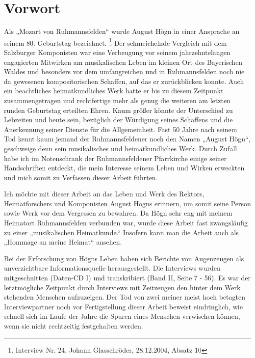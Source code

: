 \documentclass[a4paper]{article}
\begin{document}
\clearpage\setcounter{page}{1}\section{Vorwort}
\hypertarget{RefHeadingToc100333724}{}Als „Mozart von Ruhmannsfelden“
wurde August Högn in einer Ansprache an seinem 80. Geburtstag
bezeichnet. \footnote{Interview Nr. 24, Johann Glasschröder,
28.12.2004, Absatz 10} Der schmeichelnde Vergleich mit dem Salzburger
Komponisten war eine Verbeugung vor seinem jahrzehntelangen engagierten
Mitwirken am musikalischen Leben im kleinen Ort des Bayerischen Waldes
und besonders vor dem umfangreichen und in Ruhmannsfelden noch nie da
gewesenen kompositorischen Schaffen, auf das er zurückblicken konnte.
Auch ein beachtliches heimatkundliches Werk hatte er bis zu diesem
Zeitpunkt zusammengetragen und rechtfertige mehr als genug die weiteren
am letzten runden Geburtstag erteilten Ehren. Kaum größer könnte der
Unterschied zu Lebzeiten und heute sein, bezüglich der Würdigung seines
Schaffens und die Anerkennung seiner Dienste für die Allgemeinheit.
Fast 50 Jahre nach seinem Tod kennt kaum jemand der Ruhmannsfeldener
noch den Namen „August Högn“, geschweige denn sein musikalisches und
heimatkundliches Werk. Durch Zufall habe ich im Notenschrank der
Ruhmannsfeldener Pfarrkirche einige seiner Handschriften entdeckt, die
mein Interesse seinem Leben und Wirken erweckten und mich somit zu
Verfassen dieser Arbeit führten.

Ich möchte mit dieser Arbeit an das Leben und Werk des Rektors,
Heimatforschers und Komponisten August Högns erinnern, um somit seine
Person sowie Werk vor dem Vergessen zu bewahren. Da Högn sehr eng mit
meinem Heimatort Ruhmannsfelden verbunden war, wurde diese Arbeit fast
zwangsläufig zu einer „musikalischen Heimatkunde.“ Insofern kann man
die Arbeit auch als „Hommage an meine Heimat“ ansehen.

Bei der Erforschung von Högns Leben haben sich Berichte von Augenzeugen
als unverzichtbare Informationsquelle herausgestellt. Die Interviews
wurden mitgeschnitten (Daten-CD I) und transkribiert (Band II, Seite 7
- 56). Es war der letztmögliche Zeitpunkt durch Interviews mit
Zeitzeugen den hinter dem Werk stehenden Menschen aufzuzeigen. Der Tod
von zwei meiner meist hoch betagten Interviewpartner noch vor
Fertigstellung dieser Arbeit beweist eindringlich, wie schnell sich im
Laufe der Jahre die Spuren eines Menschen verwischen können, wenn sie
nicht rechtzeitig festgehalten werden.
\end{document}

